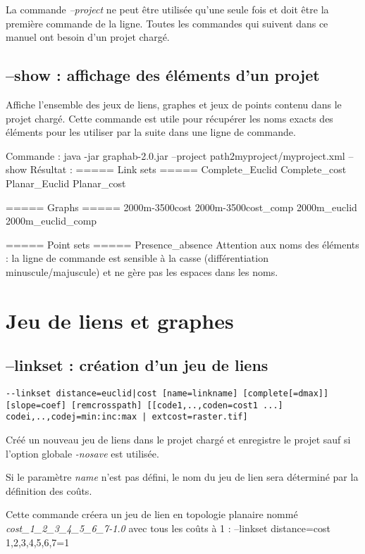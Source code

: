 \documentclass[a4paper,10pt]{report}
\newenvironment{cmd}
{\quote\Verbatim}
{\endVerbatim\endquote}
\begin{document}
La commande \textit{--project} ne peut être utilisée qu'une seule fois et doit être la première commande de la ligne.
Toutes les commandes qui suivent dans ce manuel ont besoin d'un projet chargé.

\subsection{--show : affichage des éléments d'un projet}
Affiche l'ensemble des jeux de liens, graphes et jeux de points contenu dans le projet chargé.
Cette commande est utile pour récupérer les noms exacts des éléments pour les utiliser par la suite dans une ligne de commande.

Commande :
\begin{cmd}
java -jar graphab-2.0.jar --project path2myproject/myproject.xml --show
\end{cmd}
Résultat :
\begin{cmd}
===== Link sets =====
Complete_Euclid
Complete_cost
Planar_Euclid
Planar_cost

===== Graphs =====
2000m-3500cost
2000m-3500cost_comp
2000m_euclid
2000m_euclid_comp

===== Point sets =====
Presence_absence
\end{cmd}
Attention aux noms des éléments : la ligne de commande est sensible à la casse (différentiation minuscule/majuscule) et ne gère pas les espaces dans les noms.

\section{Jeu de liens et graphes}

\subsection{--linkset : création d'un jeu de liens}
\begin{verbatim}
--linkset distance=euclid|cost [name=linkname] [complete[=dmax]] [slope=coef] [remcrosspath] [[code1,..,coden=cost1 ...] codei,..,codej=min:inc:max | extcost=raster.tif]
\end{verbatim}
Créé un nouveau jeu de liens dans le projet chargé et enregistre le projet sauf si l'option globale \textit{-nosave} est utilisée.

Si le paramètre \textit{name} n'est pas défini, le nom du jeu de lien sera déterminé par la définition des coûts.

Cette commande créera un jeu de lien en topologie planaire nommé \textit{cost\_1\_2\_3\_4\_5\_6\_7-1.0} avec tous les coûts à 1 :
\begin{cmd}
--linkset distance=cost 1,2,3,4,5,6,7=1
\end{cmd}
\end{document}
